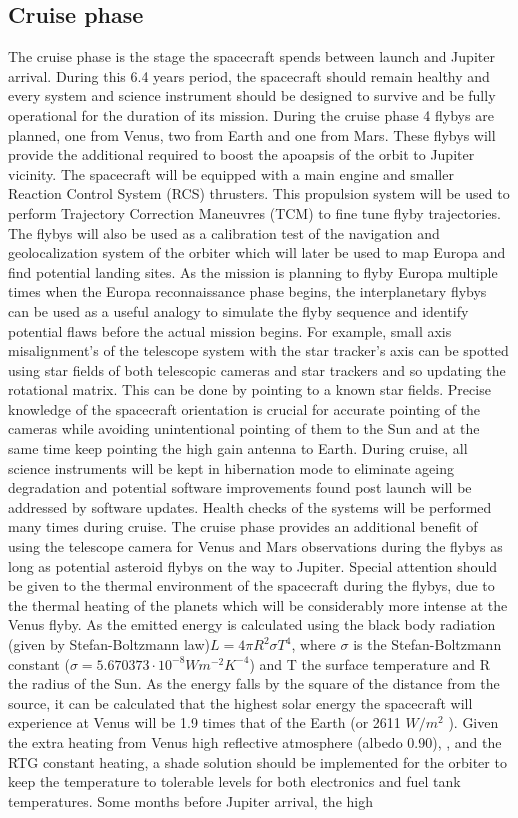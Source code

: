 \subsection{Cruise phase}
The cruise phase is the stage the spacecraft spends between launch and Jupiter arrival. During this 6.4 years period, the spacecraft should remain healthy and every system and science instrument should be designed to survive and be fully operational for the duration of its mission. During the cruise phase 4 flybys are planned, one from Venus, two from Earth and one from Mars. These flybys will provide the additional required to boost the apoapsis of the orbit to Jupiter vicinity. The spacecraft will be equipped with a main engine and smaller Reaction Control System (RCS) thrusters. This propulsion system will be used to perform Trajectory Correction Maneuvres (TCM) to fine tune flyby trajectories. The flybys will also be used as a calibration test of the navigation and geolocalization system of the orbiter which will later be used to map Europa and find potential landing sites. As the mission is planning to flyby Europa multiple times when the Europa reconnaissance phase begins, the interplanetary flybys can be used as a useful analogy to simulate the flyby sequence and identify potential flaws before the actual mission begins. For example, small axis misalignment's of the telescope system with the star tracker’s axis can be spotted using star fields of both telescopic cameras and star trackers and so updating the rotational matrix. This can be done by pointing to a known star fields. Precise knowledge of the spacecraft orientation is crucial for accurate pointing of the cameras while avoiding unintentional pointing of them to the Sun and at the same time keep pointing the high gain antenna to Earth. During cruise, all science instruments will be kept in hibernation mode to eliminate ageing degradation and potential software improvements found post launch will be addressed by software updates. Health checks of the systems will be performed many times during cruise. The cruise phase provides an additional benefit of using the telescope camera for Venus and Mars observations during the flybys as long as potential asteroid flybys on the way to Jupiter. Special attention should be given to the thermal environment of the spacecraft during the flybys, due to the thermal heating of the planets which will be considerably more intense at the Venus flyby. As the emitted energy is calculated using the black body radiation (given by Stefan-Boltzmann law)$L=4\pi R^2\sigma T^4$, where $\sigma$ is the Stefan-Boltzmann constant ($\sigma=5.670373\cdot 10^{-8}  Wm^{-2} K^{-4}$) and T the surface temperature and R the radius of the Sun. As the energy falls by the square of the distance from the source, it can be calculated that the highest solar energy the spacecraft will experience at Venus will be 1.9 times that of the Earth (or 2611 $W/m^2$ ). Given the extra heating from Venus high reflective atmosphere (albedo 0.90), \cite{venus_fact}, and the RTG constant heating, a shade solution should be implemented for the orbiter to keep the temperature to tolerable levels for both electronics and fuel tank temperatures. Some months before Jupiter arrival, the high 